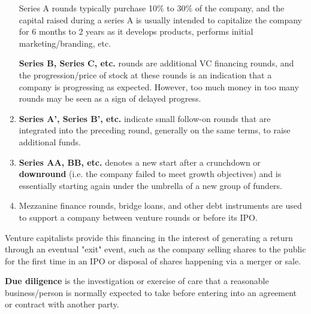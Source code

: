 \documentclass{article}
\begin{document}
\begin{definition}
\begin{enumerate}
        Series A rounds typically purchase 10\% to 30\% of the company, and the capital raised during a series A is usually intended to capitalize the company for 6 months to 2 years as it develops products, performs initial marketing/branding, etc. 
        
        \textbf{Series B, Series C, etc.} rounds are additional VC financing rounds, and the progression/price of stock at these rounds is an indication that a company is progressing as expected. However, too much money in too many rounds may be seen as a sign of delayed progress.
        \item \textbf{Series A', Series B', etc.} indicate small follow-on rounds that are integrated into the preceding round, generally on the same terms, to raise additional funds. 
        \item \textbf{Series AA, BB, etc. } denotes a new start after a crunchdown or \textbf{downround} (i.e. the company failed to meet growth objectives) and is essentially starting again under the umbrella of a new group of funders. 
        \item Mezzanine finance rounds, bridge loans, and other debt instruments are used to support a company between venture rounds or before its IPO. 
      \end{enumerate}
      Venture capitalists provide this financing in the interest of generating a return through an eventual "exit" event, such as the company selling shares to the public for the first time in an IPO or disposal of shares happening via a merger or sale. 
    \end{definition}

    \begin{definition}
      \textbf{Due diligence} is the investigation or exercise of care that a reasonable business/person is normally expected to take before entering into an agreement or contract with another party. 
    \end{definition}
\end{document}
